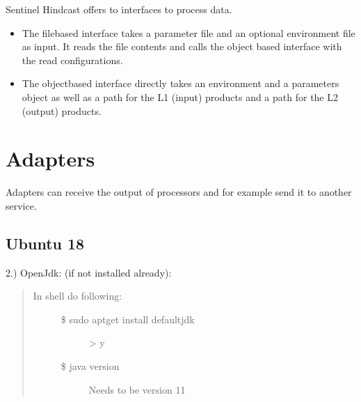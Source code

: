 \documentclass[letterpaper,10pt,english]{sphinxmanual}
\begin{document}
Sentinel Hindcast offers to interfaces to process data.
\begin{itemize}
\item {} 
The file\sphinxhyphen{}based interface takes a parameter file and an optional
environment file as input. It reads the file contents and calls the
object based interface with the read configurations.

\item {} 
The object\sphinxhyphen{}based interface directly takes an environment and a
parameters object as well as a path for the L1 (input) products and a
path for the L2 (output) products.

\end{itemize}


\section{Adapters}
\label{\detokenize{index:adapters}}
Adapters can receive the output of processors and for example send it to
another service.


\subsection{Ubuntu 18}
\label{\detokenize{ubuntu18_install:ubuntu-18}}\label{\detokenize{ubuntu18_install:ubuntu18install}}\label{\detokenize{ubuntu18_install::doc}}
2.) OpenJdk:  (if not installed already):
\begin{quote}
\begin{description}
\item[{In shell do following:}] \leavevmode\begin{description}
\item[{\$ sudo apt\sphinxhyphen{}get install default\sphinxhyphen{}jdk}] \leavevmode
\textgreater{} y

\item[{\$ java \sphinxhyphen{}version}] \leavevmode
Needs to be version 11

\end{description}

\end{description}
\end{quote}
\end{document}
